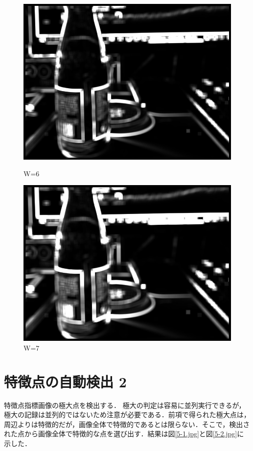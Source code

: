 \documentclass[11pt]{jarticle}
\begin{document}
\begin{figure}[h]
    \begin{minipage}{0.5\hsize}
        \centering
        \includegraphics[scale=.3]{w6.jpg}
        \caption{W=6}
    \end{minipage}
    \begin{minipage}{0.5\hsize}
        \centering
        \includegraphics[scale=.3]{w7.jpg}
        \caption{W=7}
    \end{minipage}
\end{figure}

\section{特徴点の自動検出 2}
特徴点指標画像の極大点を検出する．
極大の判定は容易に並列実行できるが，極大の記録は並列的ではないため注意が必要である．前項で得られた極大点は，周辺よりは特徴的だが，画像全体で特徴的であるとは限らない．そこで，検出された点から画像全体で特徴的な点を選び出す．結果は図\ref{5-1.jpg}と図\ref{5-2.jpg}に示した．
\end{document}
